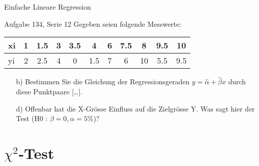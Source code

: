 \documentclass{beamer}
\begin{document}
\begin{frame}{Einfache Lineare Regression}
\begin{beamerboxesrounded}[shadow]{Aufgabe 134, Serie 12}
Gegeben seien folgende Messwerte:

\vspace{2mm}\begin{center}{\scriptsize\begin{tabular}{l|cccccccccc}
xi&1&1.5&3&3.5&4&6&7.5&8&9.5&10\\\midrule
yi&2&2.5&4&0&1.5&7&6&10&5.5&9.5 \\
\end{tabular}}\end{center}\vspace{2mm}

\begin{itemize}
\item[b)] Bestimmen Sie die Gleichung der Regressionsgeraden
$y=\hat{\alpha}+\hat{\beta}x$ durch diese Punktpaare [\dots].
\item[d)] Offenbar hat die X-Grösse Einfluss auf die Zielgrösse Y. Was sagt hier der Test (H0 :
$\beta = 0, \alpha = 5\%$)?
\end{itemize}
\end{beamerboxesrounded}
\end{frame}

\section{$\chi^2$-Test}
%
%
\end{document}
